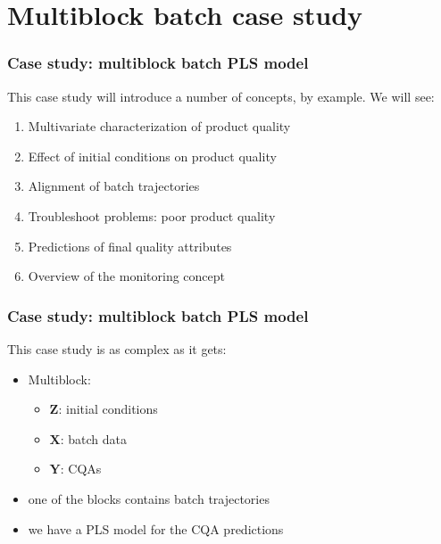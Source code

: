 
\section{Multiblock batch case study}

\begin{frame}\frametitle{Case study: multiblock batch PLS model}

This case study will introduce a number of concepts, by example. We will see:
\begin{enumerate}

	\item	Multivariate characterization of product quality
	
	\item	Effect of initial conditions on product quality
		
	\item	Alignment of batch trajectories
	
	\item 	Troubleshoot problems: poor product quality
	
	\item 	Predictions of final quality attributes
	
	\item 	Overview of the monitoring concept
	
\end{enumerate} 
\end{frame}

\begin{frame}\frametitle{Case study: multiblock batch PLS model}
	
This case study is as complex as it gets: 

\begin{itemize}
	\item	Multiblock: 
	
		\begin{itemize}
			\item	\( \mathbf{Z} \): initial conditions
			
			\item	\( \mathbf{X} \): batch data
			
			\item	\( \mathbf{Y} \): CQAs
			
		\end{itemize}
		
	\item 	one of the blocks contains batch trajectories
	
	\item	we have a PLS model for the CQA predictions
\end{itemize}

\end{frame}


